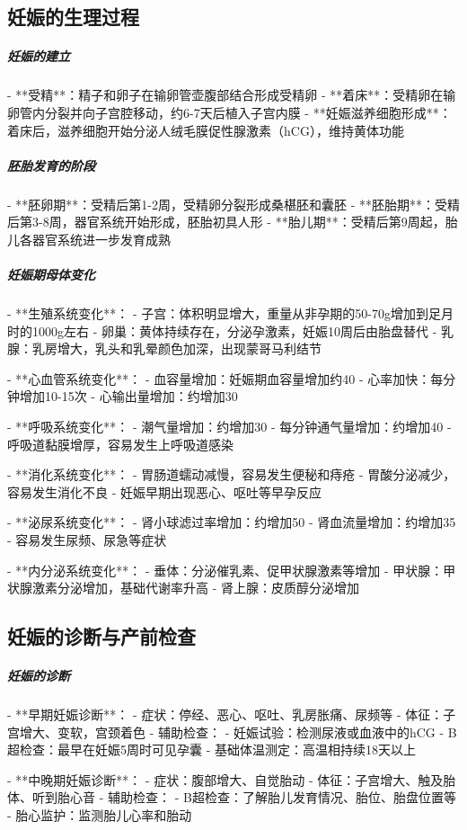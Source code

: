 \begin{enumerate}
\subsection{妊娠的生理过程}

\subparagraph{妊娠的建立}

- **受精**：精子和卵子在输卵管壶腹部结合形成受精卵
- **着床**：受精卵在输卵管内分裂并向子宫腔移动，约6-7天后植入子宫内膜
- **妊娠滋养细胞形成**：着床后，滋养细胞开始分泌人绒毛膜促性腺激素（hCG），维持黄体功能

\subparagraph{胚胎发育的阶段}

- **胚卵期**：受精后第1-2周，受精卵分裂形成桑椹胚和囊胚
- **胚胎期**：受精后第3-8周，器官系统开始形成，胚胎初具人形
- **胎儿期**：受精后第9周起，胎儿各器官系统进一步发育成熟

\subparagraph{妊娠期母体变化}

- **生殖系统变化**：
  - 子宫：体积明显增大，重量从非孕期的50-70g增加到足月时的1000g左右
  - 卵巢：黄体持续存在，分泌孕激素，妊娠10周后由胎盘替代
  - 乳腺：乳房增大，乳头和乳晕颜色加深，出现蒙哥马利结节

- **心血管系统变化**：
  - 血容量增加：妊娠期血容量增加约40%
  - 心率加快：每分钟增加10-15次
  - 心输出量增加：约增加30%

- **呼吸系统变化**：
  - 潮气量增加：约增加30%
  - 每分钟通气量增加：约增加40%
  - 呼吸道黏膜增厚，容易发生上呼吸道感染

- **消化系统变化**：
  - 胃肠道蠕动减慢，容易发生便秘和痔疮
  - 胃酸分泌减少，容易发生消化不良
  - 妊娠早期出现恶心、呕吐等早孕反应

- **泌尿系统变化**：
  - 肾小球滤过率增加：约增加50%
  - 肾血流量增加：约增加35%
  - 容易发生尿频、尿急等症状

- **内分泌系统变化**：
  - 垂体：分泌催乳素、促甲状腺激素等增加
  - 甲状腺：甲状腺激素分泌增加，基础代谢率升高
  - 肾上腺：皮质醇分泌增加

\subsection{妊娠的诊断与产前检查}

\subparagraph{妊娠的诊断}

- **早期妊娠诊断**：
  - 症状：停经、恶心、呕吐、乳房胀痛、尿频等
  - 体征：子宫增大、变软，宫颈着色
  - 辅助检查：
    - 妊娠试验：检测尿液或血液中的hCG
    - B超检查：最早在妊娠5周时可见孕囊
    - 基础体温测定：高温相持续18天以上

- **中晚期妊娠诊断**：
  - 症状：腹部增大、自觉胎动
  - 体征：子宫增大、触及胎体、听到胎心音
  - 辅助检查：
    - B超检查：了解胎儿发育情况、胎位、胎盘位置等
    - 胎心监护：监测胎儿心率和胎动


\end{enumerate}
